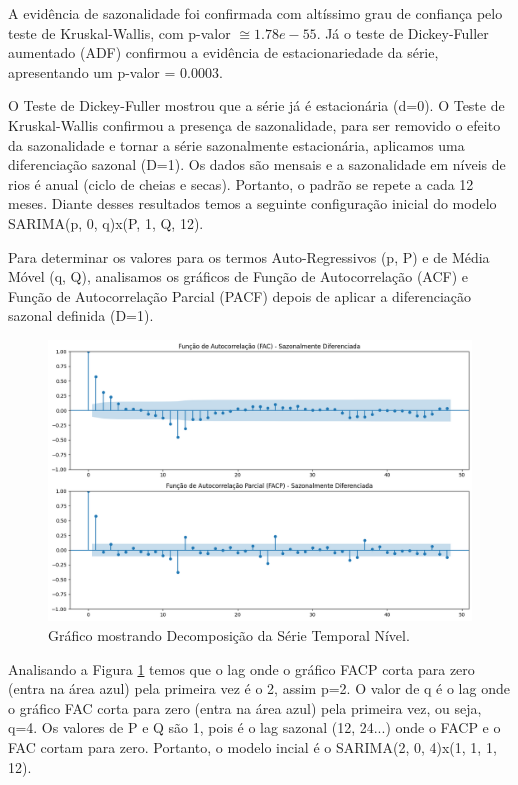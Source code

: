 \documentclass[ 12pt,a4paper ]{article} %
\begin{document}
	 A evidência de sazonalidade foi confirmada com altíssimo grau de confiança pelo teste de Kruskal-Wallis, com p-valor $\cong 1.78e-55$. Já o teste de Dickey-Fuller aumentado (ADF) confirmou a evidência de estacionariedade da série, apresentando um p-valor = 0.0003.
	 
	O Teste de Dickey-Fuller mostrou que a série já é estacionária (d=0). O Teste de Kruskal-Wallis confirmou a presença de sazonalidade, para ser removido o efeito da sazonalidade e tornar a série sazonalmente estacionária, aplicamos uma diferenciação sazonal (D=1). Os dados são mensais e a sazonalidade em níveis de rios é anual (ciclo de cheias e secas). Portanto, o padrão se repete a cada 12 meses.  Diante desses resultados temos a seguinte configuração inicial do modelo SARIMA(p, 0, q)x(P, 1, Q, 12). 
	 
	 Para determinar os valores para os termos Auto-Regressivos (p, P) e de Média Móvel (q, Q), analisamos os gráficos de Função de Autocorrelação (ACF) e Função de Autocorrelação Parcial (PACF) depois de aplicar a diferenciação sazonal definida (D=1).
	 
	 \begin{figure}[h!]
	 	\centering %
	 	\includegraphics[width=1.0\textwidth]{fac.png} %
	 	\caption{Gráfico mostrando Decomposição da Série Temporal Nível.} %
	 	\label{fig3} %
	 \end{figure}
	 
	 Analisando a Figura \ref{fig3} temos que o lag onde o gráfico FACP corta para zero (entra na área azul) pela primeira vez é o 2, assim p=2. O valor de q é o lag onde o gráfico FAC corta para zero (entra na área azul) pela primeira vez, ou seja, q=4. Os valores de P e Q são 1, pois é o lag sazonal (12, 24...) onde o FACP e o FAC cortam para zero. Portanto, o modelo incial  é o SARIMA(2, 0, 4)x(1, 1, 1, 12).
	 
\end{document}
